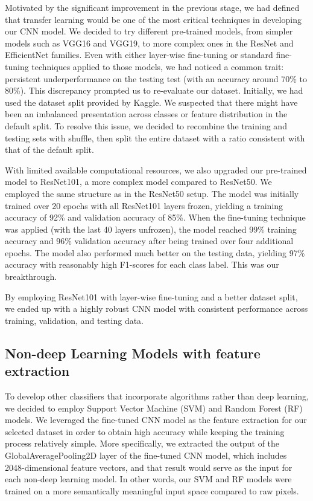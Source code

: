 \documentclass[conference]{IEEEtran}
\begin{document}
Motivated by the significant improvement in the previous stage, we had defined that transfer learning would be one of the most critical techniques in developing our CNN model. We decided to try different pre-trained models, from simpler models such as VGG16 and VGG19, to more complex ones in the ResNet and EfficientNet families. Even with either layer-wise fine-tuning or standard fine-tuning techniques applied to those models, we had noticed a common trait: persistent underperformance on the testing test (with an accuracy around 70\% to 80\%). This discrepancy prompted us to re-evaluate our dataset. Initially, we had used the dataset split provided by Kaggle. We suspected that there might have been an imbalanced presentation across classes or feature distribution in the default split. To resolve this issue, we decided to recombine the training and testing sets with shuffle, then split the entire dataset with a ratio consistent with that of the default split.  

With limited available computational resources, we also upgraded our pre-trained model to ResNet101, a more complex model compared to ResNet50. We employed the same structure as in the ResNet50 setup. The model was initially trained over 20 epochs with all ResNet101 layers frozen, yielding a training accuracy of 92\% and validation accuracy of 85\%. When the fine-tuning technique was applied (with the last 40 layers unfrozen), the model reached 99\% training accuracy and 96\% validation accuracy after being trained over four additional epochs. The model also performed much better on the testing data, yielding 97\% accuracy with reasonably high F1-scores for each class label. This was our breakthrough.

By employing ResNet101 with layer-wise fine-tuning and a better dataset split, we ended up with a highly robust CNN model with consistent performance across training, validation, and testing data.

\subsection{\large Non-deep Learning Models with feature extraction}

To develop other classifiers that incorporate algorithms rather than deep learning, we decided to employ Support Vector Machine (SVM) and Random Forest (RF) models. We leveraged the fine-tuned CNN model as the feature extraction for our selected dataset in order to obtain high accuracy while keeping the training process relatively simple. More specifically, we extracted the output of the GlobalAveragePooling2D layer of the fine-tuned CNN model, which includes 2048-dimensional feature vectors, and that result would serve as the input for each non-deep learning model. In other words, our SVM and RF models were trained on a more semantically meaningful input space compared to raw pixels. 
\end{document}
